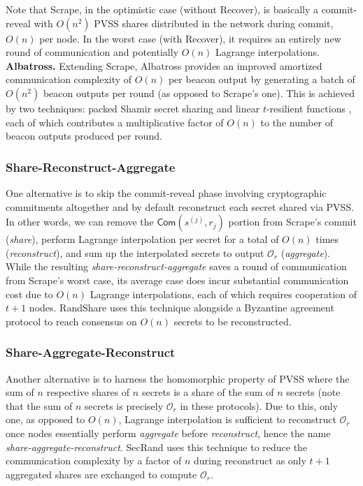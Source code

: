 \documentclass[conference]{IEEEtran}
\theoremstyle{definition}
\theoremstyle{remark}
\begin{document}
Note that Scrape, in the optimistic case (without Recover), is basically a commit-reveal with $O(n^2)$ PVSS shares distributed in the network during commit, $O(n)$ per node. In the worst case (with Recover), it requires an entirely new round of communication and potentially $O(n)$ Lagrange interpolations.\\

\noindent\textbf{Albatross.} Extending Scrape, Albatross \cite{cascudo2020albatross} provides an improved amortized communication complexity of $O(n)$ per beacon output by generating a batch of $O(n^2)$ beacon outputs per round (as opposed to Scrape's one). This is achieved by two techniques: packed Shamir secret sharing and linear $t$-resilient functions \cite{cascudo2020albatross}, each of which contributes a multiplicative factor of $O(n)$ to the number of beacon outputs produced per round.

\subsubsection{Share-Reconstruct-Aggregate}
One alternative is to skip the commit-reveal phase involving cryptographic commitments altogether and by default reconstruct each secret shared via PVSS. In other words, we can remove the $\mathsf{Com}(s^{(j)}, r_j)$ portion from Scrape's commit (\textit{share}), perform Lagrange interpolation per secret for a total of $O(n)$ times (\textit{reconstruct}), and sum up the interpolated secrets to output $\mathcal{O}_r$ (\textit{aggregate}). While the resulting \textit{share-reconstruct-aggregate} saves a round of communication from Scrape's worst case, its average case does incur substantial communication cost due to $O(n)$ Lagrange interpolations, each of which requires cooperation of $t + 1$ nodes. RandShare \cite{syta2017scalable} uses this technique alongside a Byzantine agreement protocol to reach consensus on $O(n)$ secrets to be reconstructed.

\subsubsection{Share-Aggregate-Reconstruct}
Another alternative is to harness the homomorphic property of PVSS where the sum of $n$ respective shares of $n$ secrets is a share of the sum of $n$ secrets (note that the sum of $n$ secrets is precisely $\mathcal{O}_r$ in these protocols). Due to this, only one, as opposed to $O(n)$, Lagrange interpolation is sufficient to reconstruct $\mathcal{O}_r$ once nodes essentially perform \textit{aggregate} before \textit{reconstruct}, hence the name \textit{share-aggregate-reconstruct}. SecRand \cite{guo2020secRand} uses this technique to reduce the communication complexity by a factor of $n$ during reconstruct as only $t + 1$ aggregated shares are exchanged to compute $\mathcal{O}_r$.
\end{document}
